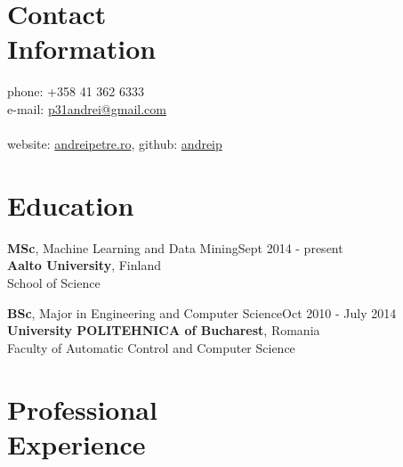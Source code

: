 \documentclass[margin,line]{resume}
\begin{document}
\begin{resume}

    \section{\mysidestyle Contact\\Information}

	phone: +358 41 362 6333              \\
	e-mail:  \href{mailto:p31andrei@gmail.com}{p31andrei@gmail.com}  \vspace{0mm}\\\vspace{-4.5mm}\\%
	website: \href{http://andreipetre.ro}{andreipetre.ro}, github: \href{https://github.com/andreip/}{andreip}

    \section{\mysidestyle Education}
    
	\textbf{MSc}, Machine Learning and Data Mining\hfill Sept 2014 - present\\
	\textbf{Aalto University}, Finland\\
    School of Science

	\textbf{BSc}, Major in Engineering and Computer Science\hfill Oct 2010 - July 2014\\
	\textbf{University POLITEHNICA of Bucharest}, Romania\\
    Faculty of Automatic Control and Computer Science

    \section{\mysidestyle Professional\\Experience}
    

\end{resume}
\end{document}
